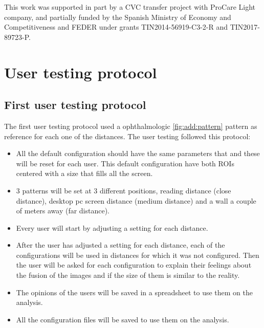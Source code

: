 \documentclass[10pt,a4paper,twocolumn,twoside]{article}
\begin{document}
	This work was supported in part by a CVC transfer project with ProCare Light company, and partially funded by the Spanish Ministry of Economy and Competitiveness and FEDER under grants TIN2014-56919-C3-2-R and TIN2017-89723-P.
	
	
	
	
	\appendix
	
	
	\section{User testing protocol}
	\subsection{First user testing protocol}
	\label{sec:annex:user1}
	The first user testing protocol used a ophthalmologic \ref{fig:add:pattern} pattern as reference for each one of the distances. The user testing followed this protocol: 
	
	\begin{itemize}
		\item All the default configuration should have the same parameters that and these will be reset for each user. This default configuration have both ROIs centered with a size that fills all the screen. 
		
		\item 3 patterns will be set at 3 different positions, reading distance (close distance), desktop pc screen distance (medium distance) and a wall a couple of meters away (far distance).
		
		\item Every user will start by adjusting a setting for each distance. 
		
		\item After the user has adjusted a setting for each distance, each of the configurations will be used in distances for which it was not configured. Then the user will be asked for each configuration to explain their feelings about the fusion of the images and if the size of them is similar to the reality.  
		
		\item The opinions of the users will be saved in a spreadsheet to use them on the analysis. 
		
		\item All the configuration files will be saved to use them on the analysis. 
	\end{itemize}
	
\end{document}
